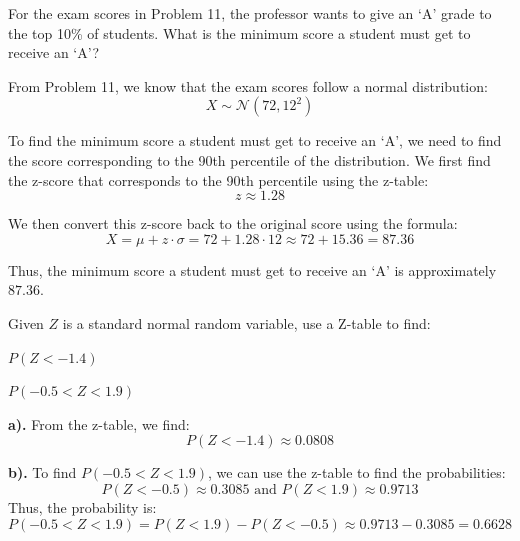 \documentclass[a4paper, 10pt]{article}
\begin{document}


\begin{problem}
For the exam scores in Problem 11, the professor wants to give an `A' grade to the top 10\% of students.
What is the minimum score a student must get to receive an `A'?
\end{problem}

\begin{solution}
From Problem 11, we know that the exam scores follow a normal distribution: \[ X \sim \mathcal{N}(72, 12^2) \]

To find the minimum score a student must get to receive an `A',
we need to find the score corresponding to the 90th percentile of the distribution.
We first find the z-score that corresponds to the 90th percentile using the z-table: \[ z \approx 1.28 \]

We then convert this z-score back to the original score using the formula:
\[ X = \mu + z \cdot \sigma = 72 + 1.28 \cdot 12 \approx 72 + 15.36 = 87.36 \]

Thus, the minimum score a student must get to receive an `A' is approximately \( \boxed{87.36} \).
\end{solution}


\begin{problem}
Given \( Z \) is a standard normal random variable, use a Z-table to find:
\begin{subproblems}
    \item \( P(Z < -1.4) \)
    \item \( P(-0.5 < Z < 1.9) \)
\end{subproblems}
\end{problem}

\begin{solution}
\textbf{a).} From the z-table, we find:
\[ P(Z < -1.4) \approx \boxed{0.0808} \]

\textbf{b).} To find \( P(-0.5 < Z < 1.9) \), we can use the z-table to find the probabilities:
\[ P(Z < -0.5) \approx 0.3085 \text{ and } P(Z < 1.9) \approx 0.9713 \]
Thus, the probability is:
\[ P(-0.5 < Z < 1.9) = P(Z < 1.9) - P(Z < -0.5) \approx 0.9713 - 0.3085 = \boxed{0.6628} \]
\end{solution}
\end{document}
